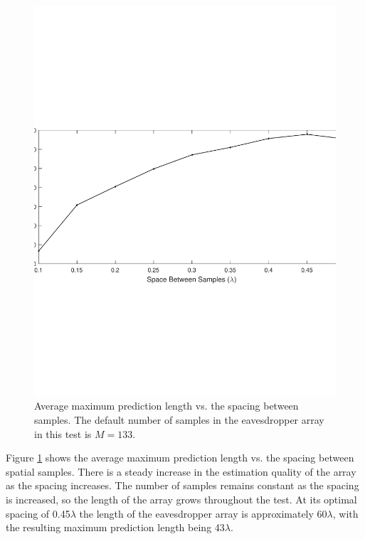\documentclass{allertonproc}
\begin{document}
\begin{figure}[tbp]
\begin{center}
\includegraphics[width=6in]{wavelengths}
\caption{Average maximum prediction length vs. the spacing between samples. The default number of samples in the eavesdropper array in this test is $M = 133$.}\label{spacing}
\end{center}
\end{figure}
Figure \ref{spacing} shows the average maximum prediction length vs. the spacing between spatial samples. There is a steady increase in the estimation quality of the array as the spacing increases. The number of samples remains constant as the spacing is increased, so the length of the array grows throughout the test. At its optimal spacing of 0.45$\lambda$ the length of the eavesdropper array is approximately 60$\lambda$, with the resulting maximum prediction length being 43$\lambda$.
\end{document}
